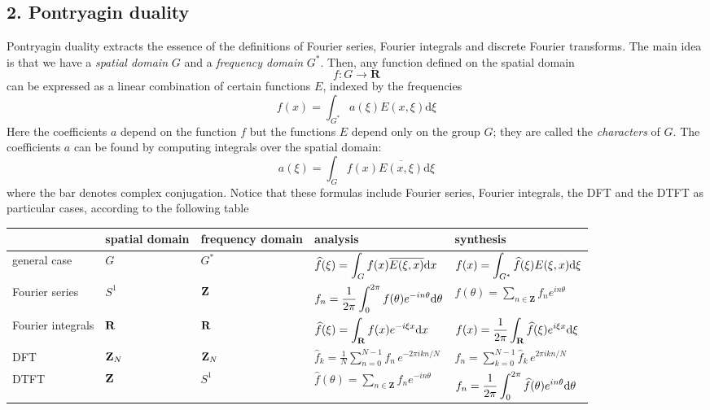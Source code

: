 \subsection{2. Pontryagin duality}

Pontryagin duality extracts the essence of the definitions of Fourier
series, Fourier integrals and discrete Fourier transforms.  The main idea is
that we have a \emph{spatial domain} $G$ and a \emph{frequency domain} $G^*$.
Then, any function defined on the spatial domain
\begin{equation}
f:G\to\mathbf{R}
\end{equation}
can be expressed as a linear combination of certain functions $E$, indexed by
the frequencies
\begin{equation}
f(x) = \int_{G^*} a(\xi) E(x,\xi) \mathrm{d} \xi
\end{equation}
Here the coefficients $a$ depend on the function $f$ but the functions $E$
depend only on the group $G$; they are called the \emph{characters} of $G$.
The coefficients $a$ can be found by computing integrals over the spatial
domain:
\begin{equation}
	a(\xi) = \int_G f(x) \overline{E(x,\xi)} \mathrm{d} \xi
\end{equation}
where the bar denotes complex conjugation.
Notice that these formulas include Fourier series, Fourier integrals, the
DFT and the DTFT as particular cases, according to the following table

\begin{tabular}{l|llll}
	 & spatial domain & frequency domain & analysis & synthesis \\
	\hline
	general case &
	$G$ &
	$G^*$ &
	$\displaystyle\widehat{f}(\xi)=\int_G f(x) \overline{E(\xi,x)}\mathrm{d} x$ &
	$\displaystyle f(x)=\int_{G^*} \widehat{f}(\xi)E(\xi,x)\mathrm{d}\xi$
	\\
	Fourier series &
	$S^1$ &
	$\mathbf{Z}$ &
	$\displaystyle f_n =
			\frac{1}{2\pi}\int_0^{2\pi} f(\theta)e^{-in\theta}\mathrm{d}\theta$ &
	$\displaystyle f(\theta)=\sum_{n\in\mathbf{Z}} f_n
			e^{in\theta}$
	\\
	Fourier integrals &
	$\mathbf{R}$ &
	$\mathbf{R}$ &
	$\displaystyle\widehat{f}(\xi)=\int_{\mathbf{R}} f(x)e^{-i\xi x}\mathrm{d} x$ &
	$\displaystyle f(x)=\frac{1}{2\pi}\int_{\mathbf{R}} \widehat{f}(\xi)e^{i\xi x}\mathrm{d} \xi$
	\\
	DFT &
	$\mathbf{Z}_N$ &
	$\mathbf{Z}_N$ &
	$\displaystyle\widehat{f}_k=\frac{1}{N}\sum_{n=0}^{N-1}f_n\,e^{-2\pi ikn/N}$ &
	$\displaystyle f_n=\sum_{k=0}^{N-1}\widehat{f}_k\,e^{2\pi ikn/N}$
	\\
	DTFT &
	$\mathbf{Z}$ &
	$S^1$ &
	$\displaystyle \widehat{f}(\theta)=\sum_{n\in\mathbf{Z}} f_n e^{-in\theta}$ &
	$\displaystyle f_n = \frac{1}{2\pi}\int_0^{2\pi}\widehat{f}(\theta)e^{in\theta}\mathrm{d}\theta$
\end{tabular}

